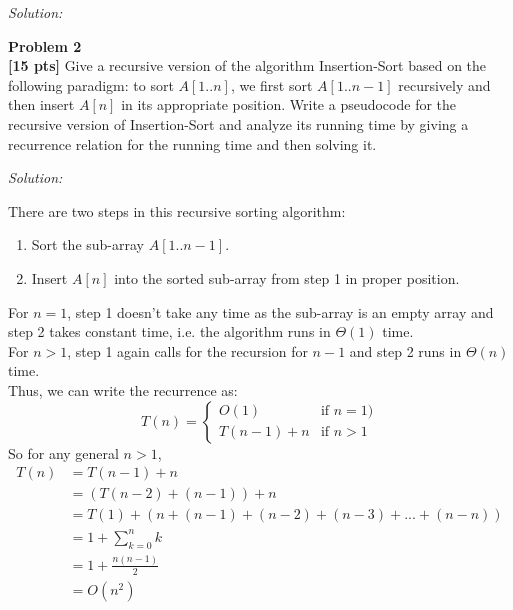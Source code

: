 \documentclass{article}
\newenvironment{problem}[2][Problem]
    { \begin{mdframed}[backgroundcolor=gray!20] \textbf{#1 #2} \\}
    {  \end{mdframed}}
\newenvironment{solution}
    {\textit{Solution:}}
    {}
\begin{document}
\begin{solution}
\begin{enumerate}
	\end{enumerate}
\end{solution}

\newpage
\begin{problem}{2}
\textbf{[15 pts]} 
Give a recursive version of the algorithm Insertion-Sort based on the following paradigm: to sort $A[1..n]$, we first sort $A[1..n - 1]$ recursively and then insert $A[n]$ in its appropriate position. Write a pseudocode for the recursive version of Insertion-Sort and analyze its running time by giving a recurrence relation for the running time and then solving it.
\end{problem}
\begin{solution}
	\begin{algorithm}
	\end{algorithm}
	\newline
	There are two steps in this recursive sorting algorithm:
	\begin{enumerate}
		\item Sort the sub-array $A[1..n - 1]$.
		\item Insert $A[n]$ into the sorted sub-array from step 1 in proper position.
	\end{enumerate}
	For $n = 1$, step 1 doesn’t take any time as the sub-array is an empty array and step 2 takes constant time, i.e. the algorithm runs in $\Theta(1)$ time.\\
	For $n > 1$, step 1 again calls for the recursion for $n - 1$ and step 2 runs in $\Theta(n)$ time.\\
	Thus, we can write the recurrence as:
	\begin{equation} 
 		T(n) = 
		\begin{cases}
 			O(1)  & \text{if $n = 1)$} \\
			T(n - 1) + n & \text{if $n > 1$}
		\end{cases}
	\end{equation}
	So for any general $n > 1$,
	\begin{equation}
		\begin{aligned}
			T(n) & = T(n - 1) + n\\
				& = (T(n - 2) + (n - 1)) + n\\
				& = T(1) + (n + (n - 1) + (n - 2) + (n - 3) + ... + (n - n))\\
				& = 1	+ \sum_{k = 0}^{n} k\\
				& = 1 + \frac{n(n - 1)}{2}\\
				& = O(n^2)
	  	\end{aligned}
	\end{equation}
\end{solution}
\end{document}
